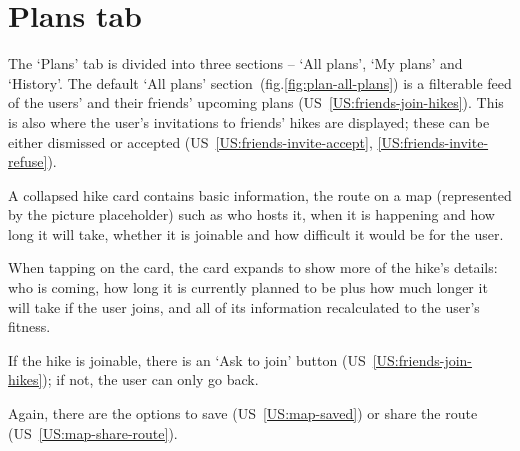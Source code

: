 \section{Plans tab}
The `Plans' tab is divided into three sections -- `All plans', `My plans' and `History'.
The default `All plans' section~(fig.\ref{fig:plan-all-plans}) is a filterable feed of the users' and their friends' upcoming plans (US~\ref{US:friends-join-hikes}).
This is also where the user's invitations to friends' hikes are displayed; these can be either dismissed or accepted (US~\ref{US:friends-invite-accept}, \ref{US:friends-invite-refuse}).

A collapsed hike card contains basic information, the route on a map (represented by the picture placeholder) such as who hosts it, when it is happening and how long it will take, whether it is joinable and how difficult it would be for the user.

When tapping on the card, the card expands to show more of the hike's details: 
who is coming, how long it is currently planned to be plus how much longer it will take if the user joins, and all of its information recalculated to the user's fitness.

If the hike is joinable, there is an `Ask to join' button (US~\ref{US:friends-join-hikes}); if not, the user can only go back.

Again, there are the options to save (US~\ref{US:map-saved}) or share the route (US~\ref{US:map-share-route}).


